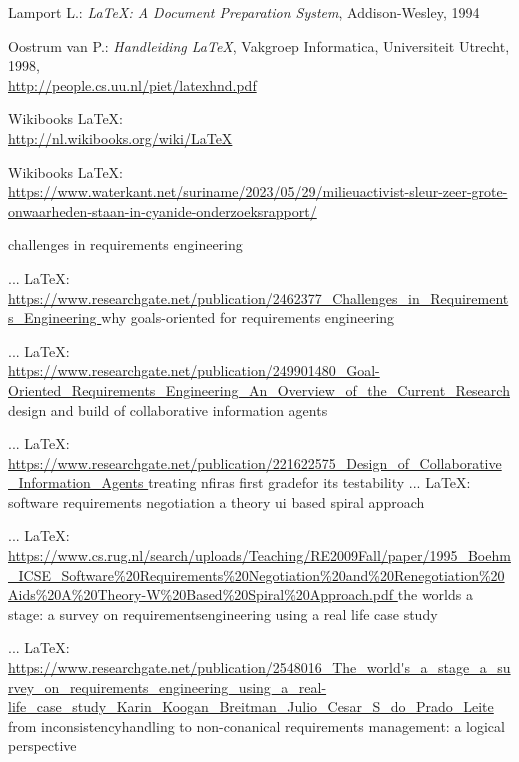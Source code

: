 
\begin{thebibliography}{99}

 Lamport L.: \emph{\LaTeX: A Document Preparation System}, Addison-Wesley, 1994 

 Oostrum van P.: \emph{Handleiding \LaTeX}, Vakgroep
  Informatica, Universiteit Utrecht, 1998,\\ 
  \url{http://people.cs.uu.nl/piet/latexhnd.pdf}

 Wikibooks \LaTeX:\\
  \url{http://nl.wikibooks.org/wiki/LaTeX}


 Wikibooks \LaTeX:\\
\url{https://www.waterkant.net/suriname/2023/05/29/milieuactivist-sleur-zeer-grote-onwaarheden-staan-in-cyanide-onderzoeksrapport/}

   

challenges in requirements engineering

 ... \LaTeX:\\ \url{https://www.researchgate.net/publication/2462377_Challenges_in_Requirements_Engineering }
why goals-oriented for requirements engineering

 ... \LaTeX:\\ \url{https://www.researchgate.net/publication/249901480_Goal-Oriented_Requirements_Engineering_An_Overview_of_the_Current_Research }
design and build of collaborative information agents

 ... \LaTeX:\\ \url{https://www.researchgate.net/publication/221622575_Design_of_Collaborative_Information_Agents }
treating nfiras first gradefor its testability
\bibitem{ } ... \LaTeX:\\ \url{ }
software requirements negotiation a theory ui based spiral approach

 ... \LaTeX:\\ \url{https://www.cs.rug.nl/search/uploads/Teaching/RE2009Fall/paper/1995_Boehm_ICSE_Software%20Requirements%20Negotiation%20and%20Renegotiation%20Aids%20A%20Theory-W%20Based%20Spiral%20Approach.pdf }
the worlds a stage: a survey on requirementsengineering using a real life case study

 ... \LaTeX:\\ \url{https://www.researchgate.net/publication/2548016_The_world's_a_stage_a_survey_on_requirements_engineering_using_a_real-life_case_study_Karin_Koogan_Breitman_Julio_Cesar_S_do_Prado_Leite }
from inconsistencyhandling to non-conanical requirements management: a logical perspective


\end{thebibliography}
